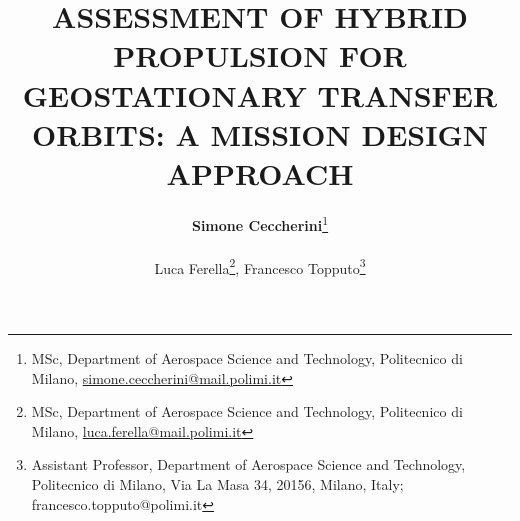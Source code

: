 \title[IAC2016]{\large ASSESSMENT OF HYBRID PROPULSION FOR GEOSTATIONARY TRANSFER ORBITS: A MISSION DESIGN APPROACH}


\author{\large {\bfseries Simone Ceccherini}\thanks{MSc, Department of Aerospace Science and Technology, Politecnico di Milano, \href{mailto:simone.ceccherini@mail.polimi.it}{simone.ceccherini@mail.polimi.it}}\\~\\
        \large Luca Ferella\thanks{MSc, Department of Aerospace Science and Technology, Politecnico di Milano, \href{luca.ferella@mail.polimi.it}{luca.ferella@mail.polimi.it}},
\large {Francesco Topputo}\thanks{Assistant Professor, Department of Aerospace Science and Technology, Politecnico di Milano, Via La Masa 34, 20156, Milano, Italy; francesco.topputo@polimi.it}
}